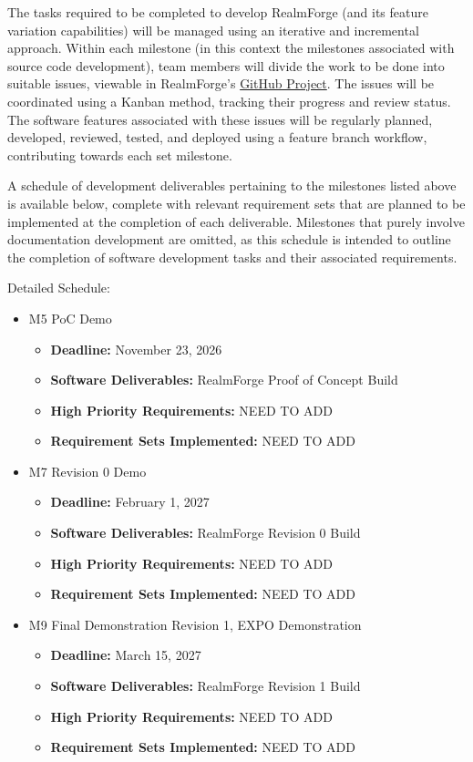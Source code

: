 The tasks required to be completed to develop RealmForge (and its feature 
variation capabilities) will be managed using an iterative and incremental 
approach. Within each milestone (in this context the milestones associated with 
source code development), team members will divide the work to be done 
into suitable issues, viewable in RealmForge's 
\href{https://github.com/orgs/Aeolus-Software/projects/2}{{GitHub Project}}. 
The issues will be coordinated using a Kanban method, tracking their progress 
and review status.
The software features associated with these issues will be regularly planned, 
developed, reviewed, tested, and deployed using a feature branch workflow, 
contributing towards each set milestone. 

\noindent \newline
A schedule of development deliverables
pertaining to the milestones listed above is available below, complete with 
relevant requirement sets that are planned to be implemented at the completion 
of 
each deliverable. Milestones that purely involve documentation development are 
omitted, as this schedule is intended to outline the completion of software 
development tasks and their associated requirements.

\noindent \newline
Detailed Schedule:

\begin{itemize}
	\item M5 PoC Demo
	\begin{itemize}
		\item \textbf{Deadline:} November 23, 2026
		\item \textbf{Software Deliverables:} RealmForge Proof of Concept Build
		\item \textbf{High Priority Requirements:} NEED TO ADD
		\item \textbf{Requirement Sets Implemented:} NEED TO ADD
	\end{itemize}
	\item M7 Revision 0 Demo
	\begin{itemize}
		\item \textbf{Deadline:} February 1, 2027
		\item \textbf{Software Deliverables:} RealmForge Revision 0 Build
		\item \textbf{High Priority Requirements:} NEED TO ADD
		\item \textbf{Requirement Sets Implemented:} NEED TO ADD
	\end{itemize}
	\item M9 Final Demonstration Revision 1, EXPO Demonstration
	\begin{itemize}
		\item \textbf{Deadline:} March 15, 2027
		\item \textbf{Software Deliverables:} RealmForge Revision 1 Build
		\item \textbf{High Priority Requirements:} NEED TO ADD
		\item \textbf{Requirement Sets Implemented:} NEED TO ADD
	\end{itemize}
\end{itemize}

